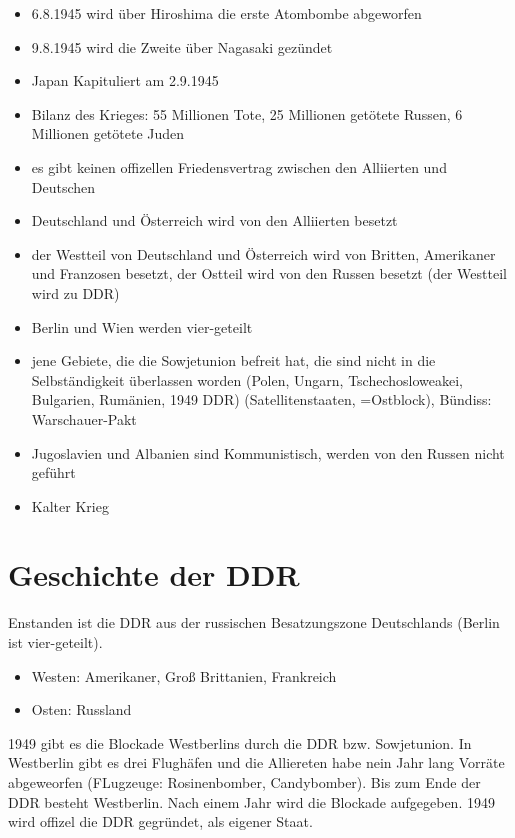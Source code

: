 \documentclass[a4paper,final]{report}
\begin{document}
\begin{itemize}
	\item 6.8.1945 wird über Hiroshima die erste Atombombe abgeworfen
	\item 9.8.1945 wird die Zweite über Nagasaki gezündet
	\item Japan Kapituliert am 2.9.1945
	\item Bilanz des Krieges: 55 Millionen Tote, 25 Millionen getötete Russen, 6 Millionen getötete Juden
	\item es gibt keinen offizellen Friedensvertrag zwischen den Alliierten und Deutschen
	\item Deutschland und Österreich wird von den Alliierten besetzt
	\item der Westteil von Deutschland und Österreich wird von Britten, Amerikaner und Franzosen besetzt, der Ostteil wird von den Russen besetzt (der 
	Westteil wird zu DDR)
	\item Berlin und Wien werden vier-geteilt
	\item jene Gebiete, die die Sowjetunion befreit hat, die sind nicht in die Selbständigkeit überlassen worden (Polen, Ungarn, Tschechosloweakei, Bulgarien, Rumänien, 1949 DDR) (Satellitenstaaten, =Ostblock), Bündiss: Warschauer-Pakt
	\item Jugoslavien und Albanien sind Kommunistisch, werden von den Russen nicht geführt
	\item Kalter Krieg
	\end{itemize}

\newpage

\chapter{Geschichte der DDR}

Enstanden ist die DDR aus der russischen Besatzungszone Deutschlands (Berlin ist vier-geteilt).

	\begin{itemize}
		\item Westen: Amerikaner, Groß Brittanien, Frankreich
		\item Osten: Russland
	\end{itemize}
	
1949 gibt es die Blockade Westberlins durch die DDR bzw. Sowjetunion. In Westberlin gibt es drei Flughäfen und die Alliereten habe nein Jahr lang Vorräte abgeweorfen (FLugzeuge: Rosinenbomber, Candybomber). Bis zum Ende der DDR besteht Westberlin. Nach einem Jahr wird die Blockade aufgegeben. 1949 wird offizel die DDR gegründet, als eigener Staat.
\end{document}
